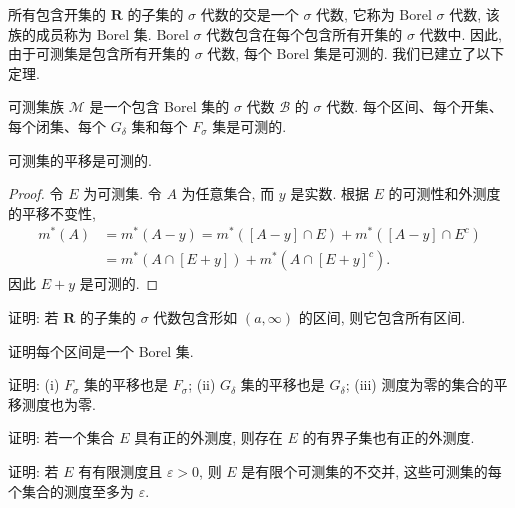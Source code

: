 \documentclass[../../main.tex]{subfiles}
\begin{document}
所有包含开集的 $\mathbf{R}$ 的子集的 $\sigma$ 代数的交是一个 $\sigma$ 代数, 它称为 Borel $\sigma$ 代数, 该族的成员称为 Borel 集. Borel $\sigma$ 代数包含在每个包含所有开集的 $\sigma$ 代数中. 因此, 由于可测集是包含所有开集的 $\sigma$ 代数, 每个 Borel 集是可测的. 我们已建立了以下定理.

\begin{theorem}\label{theorem:ch02-可测Borel}
可测集族 $\mathcal{M}$ 是一个包含 Borel 集的 $\sigma$ 代数 $\mathcal{B}$ 的 $\sigma$ 代数. 每个区间、每个开集、每个闭集、每个 $G_{\delta}$ 集和每个 $F_{\sigma}$ 集是可测的.
\end{theorem}

\begin{proposition}\label{proposition:ch02-可测平移}
可测集的平移是可测的.
\end{proposition}

\begin{proof}
令 $E$ 为可测集. 令 $A$ 为任意集合, 而 $y$ 是实数. 根据 $E$ 的可测性和外测度的平移不变性,
\begin{align*}
m^{*}(A)&=m^{*}(A-y)=m^{*}([A-y]\cap E)+m^{*}([A-y]\cap E^{c})\\
&=m^{*}(A\cap[E+y])+m^{*}(A\cap[E+y]^{c}).
\end{align*}
因此 $E+y$ 是可测的.
\end{proof}

\begin{exercise}\label{exercise:ch02-11}
证明: 若 $\mathbf{R}$ 的子集的 $\sigma$ 代数包含形如 $(a,\infty)$ 的区间, 则它包含所有区间.
\end{exercise}

\begin{exercise}\label{exercise:ch02-12}
证明每个区间是一个 Borel 集.
\end{exercise}

\begin{exercise}\label{exercise:ch02-13}
证明: (i) $F_{\sigma}$ 集的平移也是 $F_{\sigma}$; (ii) $G_{\delta}$ 集的平移也是 $G_{\delta}$; (iii) 测度为零的集合的平移测度也为零.
\end{exercise}

\begin{exercise}\label{exercise:ch02-14}
证明: 若一个集合 $E$ 具有正的外测度, 则存在 $E$ 的有界子集也有正的外测度.
\end{exercise}

\begin{exercise}\label{exercise:ch02-15}
证明: 若 $E$ 有有限测度且 $\varepsilon>0$, 则 $E$ 是有限个可测集的不交并, 这些可测集的每个集合的测度至多为 $\varepsilon$.
\end{exercise}
\end{document}
